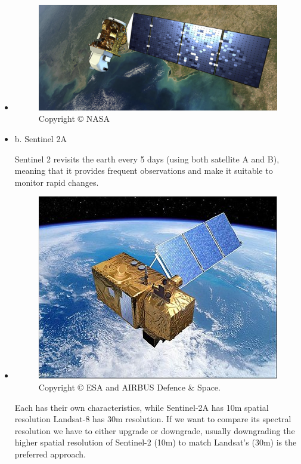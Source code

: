 \documentclass[
  letterpaper,
  DIV=11,
  numbers=noendperiod]{scrreprt}
\begin{document}
\begin{itemize}
\item
  \begin{figure}

  {\centering \includegraphics[width=4.1875in,height=\textheight]{images/clipboard-1188776161.png}

  }

  \caption{Copyright © NASA}

  \end{figure}
\item
  b. Sentinel 2A

  Sentinel 2 revisits the earth every 5 days (using both satellite A and
  B), meaning that it provides frequent observations and make it
  suitable to monitor rapid changes.
\end{itemize}

\begin{itemize}
\item
  \begin{figure}

  {\centering \includegraphics{images/clipboard-3938270325.png}

  }

  \caption{Copyright © ESA and AIRBUS Defence \& Space.}

  \end{figure}

  Each has their own characteristics, while Sentinel-2A has 10m spatial
  resolution Landsat-8 has 30m resolution. If we want to compare its
  spectral resolution we have to either upgrade or downgrade, usually
  downgrading the higher spatial resolution of Sentinel-2 (10m) to match
  Landsat's (30m) is the preferred approach.
\end{itemize}
\end{document}
